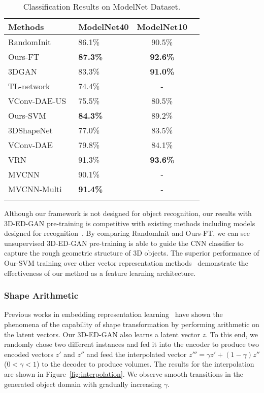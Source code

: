 \documentclass[10pt,twocolumn,letterpaper]{article}
\begin{document}
\begin{table}
\begin{center}
\setlength{\tabcolsep}{0.1em}
\begin{tabular}{llcc}
\Xhline{3\arrayrulewidth}
Methods&ModelNet40&ModelNet10\\
\hline
RandomInit&86.1\%&90.5\%\\
Ours-FT&\textbf{87.3\%}&\textbf{92.6\%}\\
\hline
3DGAN~\cite{3dgan}&83.3\%&\textbf{91.0\%}\\
TL-network~\cite{tl}&74.4\%&-\\
VConv-DAE-US~\cite{vconvdae}&75.5\%&80.5\%\\
Ours-SVM&\textbf{84.3\%}&89.2\%\\
\hline
3DShapeNet~\cite{shapenet}&77.0\%&83.5\%\\
VConv-DAE~\cite{vconvdae}&79.8\%&84.1\%\\
VRN~\cite{generativediscriminative}&91.3\%&\textbf{93.6\%}\\
MVCNN~\cite{sumultiview}&90.1\%&-\\
MVCNN-Multi\cite{qimultiview}&\textbf{91.4\%}&-\\
\Xhline{3\arrayrulewidth}
\end{tabular}
\end{center}
\caption{Classification Results on ModelNet Dataset.}
\label{table:classification}
\end{table}

Although our framework is not designed for object recognition, our results with 3D-ED-GAN pre-training is competitive with existing methods including models designed for recognition~\cite{generativediscriminative,sumultiview}. By comparing RandomInit and Ours-FT, we can see unsupervised 3D-ED-GAN pre-training is able to guide the CNN classifier to capture the rough geometric structure of 3D objects. The superior performance of Our-SVM training over other vector representation methods~\cite{tl,3dgan,vconvdae} demonstrate the effectiveness of our method as a feature learning architecture.


\subsubsection{Shape Arithmetic}

Previous works in embedding representation learning~\cite{3dgan,tl} have shown the phenomena of the capability of shape transformation by performing arithmetic on the latent vectors. Our 3D-ED-GAN also learns a latent vector $z$. To this end, we randomly chose two different instances and fed it into the encoder to produce two encoded vectors $z'$ and $z''$ and feed the interpolated vector $z'''=\gamma z'+(1-\gamma)z''$ ($0<\gamma<1$) to the decoder to produce volumes. The results for the interpolation are shown in Figure~\ref{fig:interpolation}. We observe smooth transitions in the generated object domain with gradually increasing $\gamma$.
\end{document}
